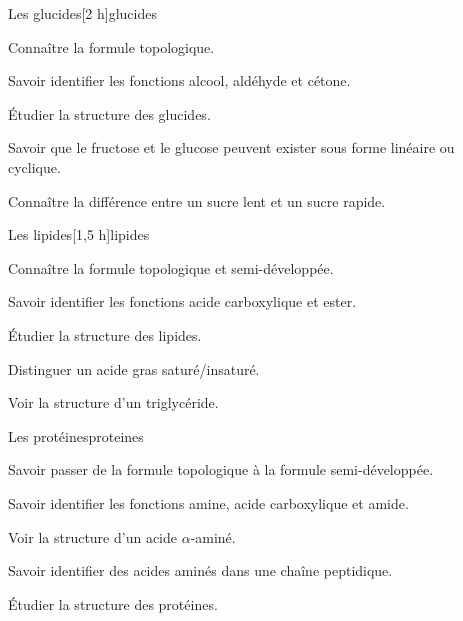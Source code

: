\begin{multicols}{2}
  \begin{TP}{Les glucides}[2 h]{glucides}
    \begin{prerequis}
      \item Connaître la formule topologique.
      \item Savoir identifier les fonctions alcool, aldéhyde et cétone.
    \end{prerequis}
    \begin{objectifs}  
      \item Étudier la structure des glucides.
      \item Savoir que le fructose et le glucose peuvent exister sous forme linéaire ou cyclique.
      \item Connaître la différence entre un sucre lent et un sucre rapide.
    \end{objectifs}
  \end{TP}
  \smallskip

  \begin{activite}{Les lipides}[1,5 h]{lipides}
    \begin{prerequis}
      \item Connaître la formule topologique et semi-développée.
      \item Savoir identifier les fonctions acide carboxylique et ester.
    \end{prerequis}
    \begin{objectifs}
      \item Étudier la structure des lipides.
      \item Distinguer un acide gras saturé/insaturé.
      \item Voir la structure d'un triglycéride.
    \end{objectifs}
  \end{activite}

  \begin{activite}{Les protéines}{proteines}
    \begin{prerequis}
      \item Savoir passer de la formule topologique à la formule semi-développée.
      \item Savoir identifier les fonctions amine, acide carboxylique et amide.
    \end{prerequis}
    \begin{objectifs}
      \item Voir la structure d'un acide $\alpha$-aminé.
      \item Savoir identifier des acides aminés dans une chaîne peptidique.
      \item Étudier la structure des protéines.
    \end{objectifs}
  \end{activite}
  \smallskip


\end{multicols}
